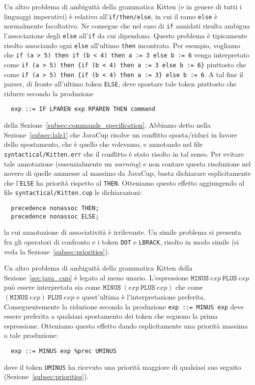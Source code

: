 Un altro problema di ambiguit\`a della grammatica Kitten (e in genere di
tutti i linguaggi imperativi) \`e relativo
all'\texttt{if/then/else}, in cui il ramo \texttt{else} \`e normalmente
facoltativo. Ne consegue che nel caso di \texttt{if} annidati risulta ambigua
l'associazione degli \texttt{else} all'\texttt{if} da cui dipendono.
Questo problema \`e tipicamente risolto associando
ogni \texttt{else} all'ultimo \texttt{then} incontrato. Per esempio,
vogliamo che
\texttt{if (a > 5) then if (b < 4) then a := 3 else b := 6}
venga interpretato come
\texttt{if (a > 5) then \{if (b < 4) then a := 3 else b := 6\}}
piuttosto che come
\texttt{if (a > 5) then \{if (b < 4) then a := 3\} else b := 6}.
A tal fine il parser, di fronte all'ultimo token \texttt{ELSE},
deve spostare tale token piuttosto che ridurre secondo la produzione
%
\begin{verbatim}
  exp ::= IF LPAREN exp RPAREN THEN command
\end{verbatim}
%
della Sezione~\ref{subsec:commands_specification}.
Abbiamo detto nella Sezione~\ref{subsec:lalr1} che
JavaCup risolve un conflitto sposta/riduci in favore dello spostamento,
che \`e quello che volevamo, e annotando nel
file \texttt{syntactical/Kitten.err} che il conflitto \`e stato risolto in
tal senso. Per evitare tale annotazione (essenzialmente un \emph{warning})
e non contare questa risoluzione nel novero di quelle ammesse al massimo
da JavaCup, basta dichiarare esplicitamente che l'\texttt{ELSE} ha priorit\`a
rispetto al \texttt{THEN}. Otteniamo questo effetto aggiungendo al file
\texttt{syntactical/Kitten.cup} le dichiarazioni:
%
\begin{verbatim}
  precedence nonassoc THEN;
  precedence nonassoc ELSE;
\end{verbatim}
%
la cui annotazione di associativit\`a \`e irrilevante.
Un simile problema si presenta fra gli operatori di confronto e i token
\texttt{DOT} e \texttt{LBRACK}, risolto in modo simile (si veda la
Sezione~\ref{subsec:priorities}).

Un altro problema di ambiguit\`a della grammatica Kitten della
Sezione~\ref{sec:java_cup} \`e legato al meno unario. L'espressione
$\mathtt{MINUS}\ \mathit{exp}\ \mathtt{PLUS}\ \mathit{exp}$ pu\`o
essere interpretata sia come
$\mathtt{MINUS}\ (\mathit{exp}\ \mathtt{PLUS}\ \mathit{exp})$ che come
$(\mathtt{MINUS}\ \mathit{exp})\ \mathtt{PLUS}\ \mathit{exp}$ e quest'ultima
\`e l'interpretazione preferita. Conseguentemente la riduzione
secondo la produzione \texttt{exp ::= MINUS exp} deve essere preferita
a qualsiasi spostamento dei token che seguono la prima espressione.
Otteniamo questo effetto dando esplicitamente una priorit\`a massima a tale
produzione:
%
\begin{verbatim}
  exp ::= MINUS exp %prec UMINUS
\end{verbatim}
%
dove il token \texttt{UMINUS} ha ricevuto una priorit\`a maggiore di qualsiasi
suo seguito (Sezione~\ref{subsec:priorities}).

